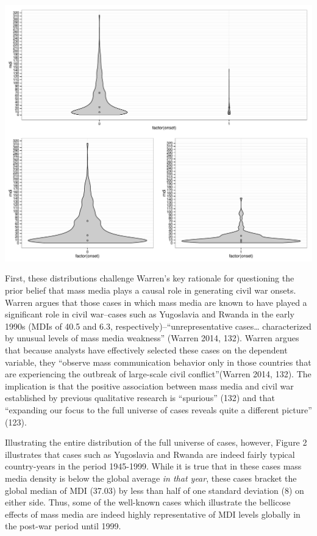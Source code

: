 \documentclass[11pt,article,oneside]{memoir}
\makeatletter
\def\maxwidth{\ifdim\Gin@nat@width>\linewidth\linewidth
\else\Gin@nat@width\fi}
\let\Oldincludegraphics\includegraphics
\renewcommand{\includegraphics}[1]{\Oldincludegraphics[width=\maxwidth]{#1}}
\makeatother
\begin{document}
\clearpage
\includegraphics{./media_civil_war_files/figure-markdown/violinplot.pdf}
\clearpage

First, these distributions challenge Warren's key rationale for
questioning the prior belief that mass media plays a causal role in
generating civil war onsets. Warren argues that those cases in which
mass media are known to have played a significant role in civil
war--cases such as Yugoslavia and Rwanda in the early 1990s (MDIs of
40.5 and 6.3, respectively)--``unrepresentative cases\ldots{}
characterized by unusual levels of mass media weakness'' (Warren 2014,
132). Warren argues that because analysts have effectively selected
these cases on the dependent variable, they ``observe mass communication
behavior only in those countries that are experiencing the outbreak of
large-scale civil conflict''(Warren 2014, 132). The implication is that
the positive association between mass media and civil war established by
previous qualitative research is ``spurious'' (132) and that ``expanding
our focus to the full universe of cases reveals quite a different
picture'' (123).

Illustrating the entire distribution of the full universe of cases,
however, Figure 2 illustrates that cases such as Yugoslavia and Rwanda
are indeed fairly typical country-years in the period 1945-1999. While
it is true that in these cases mass media density is below the global
average \emph{in that year}, these cases bracket the global median of
MDI (37.03) by less than half of one standard deviation (8) on either
side. Thus, some of the well-known cases which illustrate the bellicose
effects of mass media are indeed highly representative of MDI levels
globally in the post-war period until 1999.
\end{document}
